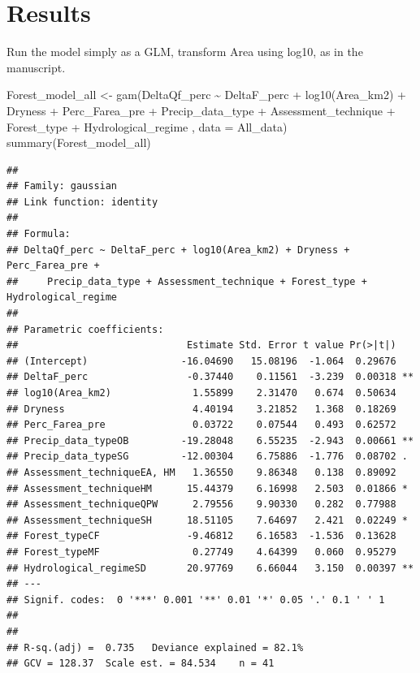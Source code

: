 \documentclass[]{elsarticle} %
\newenvironment{Shaded}{\begin{snugshade}}{\end{snugshade}}
\newcommand{\AttributeTok}[1]{\textcolor[rgb]{0.77,0.63,0.00}{#1}}
\newcommand{\FunctionTok}[1]{\textcolor[rgb]{0.00,0.00,0.00}{#1}}
\newcommand{\NormalTok}[1]{#1}
\newcommand{\OtherTok}[1]{\textcolor[rgb]{0.56,0.35,0.01}{#1}}
\newcommand{\SpecialCharTok}[1]{\textcolor[rgb]{0.00,0.00,0.00}{#1}}
\begin{document}
\hypertarget{results}{%
\section{Results}\label{results}}

Run the model simply as a GLM, transform Area using log10, as in the manuscript.

\begin{Shaded}
\begin{Highlighting}[]
\NormalTok{Forest\_model\_all }\OtherTok{\textless{}{-}} \FunctionTok{gam}\NormalTok{(DeltaQf\_perc }\SpecialCharTok{\textasciitilde{}}\NormalTok{ DeltaF\_perc }\SpecialCharTok{+} 
                    \FunctionTok{log10}\NormalTok{(Area\_km2) }\SpecialCharTok{+} 
\NormalTok{                    Dryness }\SpecialCharTok{+} 
\NormalTok{                    Perc\_Farea\_pre }\SpecialCharTok{+}
\NormalTok{                    Precip\_data\_type }\SpecialCharTok{+}\NormalTok{  Assessment\_technique }\SpecialCharTok{+}
\NormalTok{                    Forest\_type }\SpecialCharTok{+}
\NormalTok{                    Hydrological\_regime}
\NormalTok{                    , }\AttributeTok{data =}\NormalTok{ All\_data)}
\FunctionTok{summary}\NormalTok{(Forest\_model\_all)}
\end{Highlighting}
\end{Shaded}

\begin{verbatim}
## 
## Family: gaussian 
## Link function: identity 
## 
## Formula:
## DeltaQf_perc ~ DeltaF_perc + log10(Area_km2) + Dryness + Perc_Farea_pre + 
##     Precip_data_type + Assessment_technique + Forest_type + Hydrological_regime
## 
## Parametric coefficients:
##                             Estimate Std. Error t value Pr(>|t|)   
## (Intercept)                -16.04690   15.08196  -1.064  0.29676   
## DeltaF_perc                 -0.37440    0.11561  -3.239  0.00318 **
## log10(Area_km2)              1.55899    2.31470   0.674  0.50634   
## Dryness                      4.40194    3.21852   1.368  0.18269   
## Perc_Farea_pre               0.03722    0.07544   0.493  0.62572   
## Precip_data_typeOB         -19.28048    6.55235  -2.943  0.00661 **
## Precip_data_typeSG         -12.00304    6.75886  -1.776  0.08702 . 
## Assessment_techniqueEA, HM   1.36550    9.86348   0.138  0.89092   
## Assessment_techniqueHM      15.44379    6.16998   2.503  0.01866 * 
## Assessment_techniqueQPW      2.79556    9.90330   0.282  0.77988   
## Assessment_techniqueSH      18.51105    7.64697   2.421  0.02249 * 
## Forest_typeCF               -9.46812    6.16583  -1.536  0.13628   
## Forest_typeMF                0.27749    4.64399   0.060  0.95279   
## Hydrological_regimeSD       20.97769    6.66044   3.150  0.00397 **
## ---
## Signif. codes:  0 '***' 0.001 '**' 0.01 '*' 0.05 '.' 0.1 ' ' 1
## 
## 
## R-sq.(adj) =  0.735   Deviance explained = 82.1%
## GCV = 128.37  Scale est. = 84.534    n = 41
\end{verbatim}
\end{document}
